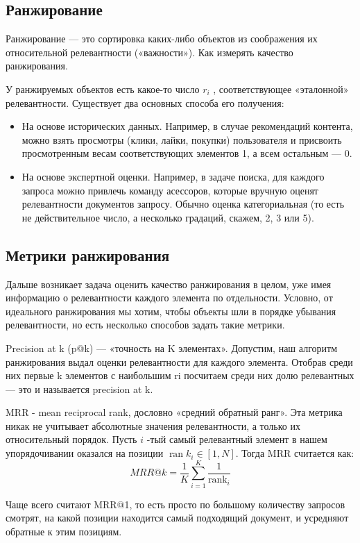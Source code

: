 \subsection{Ранжирование}
Ранжирование — это сортировка каких-либо объектов из соображения их относительной релевантности («важности»).
Как измерять качество ранжирования.

У ранжируемых объектов есть какое-то число  $r_i$ , соответствующее «эталонной» релевантности. Существует два основных способа его получения:

\begin{itemize}
    \item На основе исторических данных. Например, в случае рекомендаций контента, можно взять просмотры (клики, лайки, покупки) пользователя и присвоить просмотренным весам соответствующих элементов 1, а всем остальным — 0.
    \item На основе экспертной оценки. Например, в задаче поиска, для каждого запроса можно привлечь команду асессоров, которые вручную оценят релевантности документов запросу. Обычно оценка категориальная (то есть не действительное число, а несколько градаций, скажем, 2, 3 или 5).
\end{itemize}

\subsection{Метрики ранжирования}
Дальше возникает задача оценить качество ранжирования в целом, уже имея информацию о релевантности каждого элемента по отдельности. Условно, от идеального ранжирования мы хотим, чтобы объекты шли в порядке убывания релевантности, но есть несколько способов задать такие метрики.

Precision at k (p@k) — «точность на  K  элементах». Допустим, наш алгоритм ранжирования выдал оценки релевантности для каждого элемента. Отобрав среди них первые  k  элементов с наибольшим  ri  посчитаем среди них долю релевантных — это и называется precision at k.

MRR - mean reciprocal rank, дословно «средний обратный ранг».
Эта метрика никак не учитывает абсолютные значения релевантности, а только их относительный порядок. Пусть $i$ -тый самый релевантный элемент в нашем упорядочивании оказался на позиции $\operatorname{ran} k_{i} \in[1, N] .$ Тогда MRR считается как:
$$
M R R @ k=\frac{1}{K} \sum_{i=1}^{K} \frac{1}{\operatorname{rank}_{i}}
$$

Чаще всего считают MRR@1, то есть просто по большому количеству запросов смотрят, на какой позиции находится самый подходящий документ, и усредняют обратные к этим позициям.

